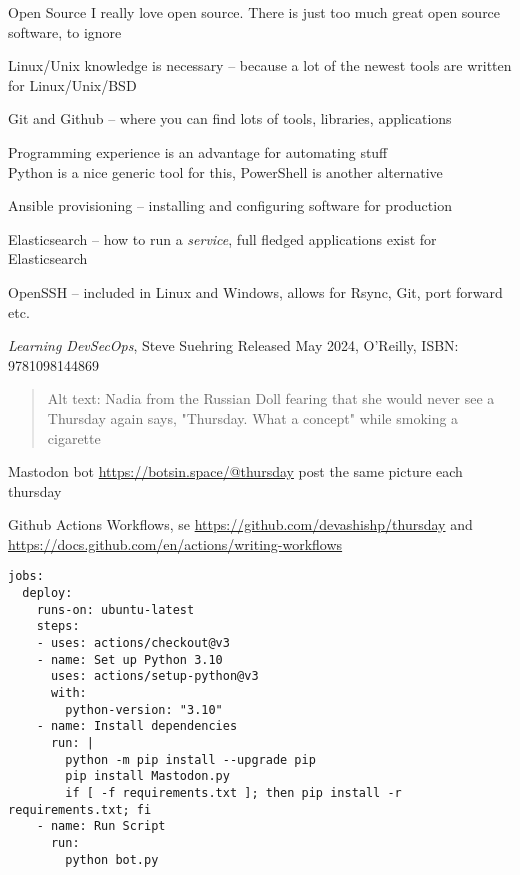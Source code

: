 \documentclass[Screen16to9,17pt]{foils}
\begin{document}
\begin{list2}
\item Open Source I really love open source. There is just too much great open source software, to ignore
\item Linux/Unix knowledge is necessary
-- because a lot of the newest tools are written for Linux/Unix/BSD
\item Git and Github -- where you can find lots of tools, libraries, applications
\item Programming experience is an advantage for automating stuff\\
Python is a nice generic tool for this, PowerShell is another alternative
\item Ansible provisioning -- installing and configuring software for production
\item Elasticsearch -- how to run a \emph{service}, full fledged applications exist for Elasticsearch
\item OpenSSH -- included in Linux and Windows, allows for Rsync, Git, port forward etc.
\end{list2}



\emph{Learning DevSecOps}, Steve Suehring
Released May 2024, O'Reilly, ISBN: 9781098144869



\begin{quote}
Alt text: Nadia from the Russian Doll fearing that she would never see a Thursday again says, "Thursday. What a concept" while smoking a cigarette
\end{quote}

\begin{list2}
\item Mastodon bot \url{https://botsin.space/@thursday} post the same picture each thursday
\item Github Actions Workflows, se \url{https://github.com/devashishp/thursday} and \url{https://docs.github.com/en/actions/writing-workflows}

\end{list2}


\begin{verbatim}
jobs:
  deploy:
    runs-on: ubuntu-latest
    steps:
    - uses: actions/checkout@v3
    - name: Set up Python 3.10
      uses: actions/setup-python@v3
      with:
        python-version: "3.10"
    - name: Install dependencies
      run: |
        python -m pip install --upgrade pip
        pip install Mastodon.py
        if [ -f requirements.txt ]; then pip install -r requirements.txt; fi
    - name: Run Script
      run:
        python bot.py
\end{verbatim}
\end{document}
